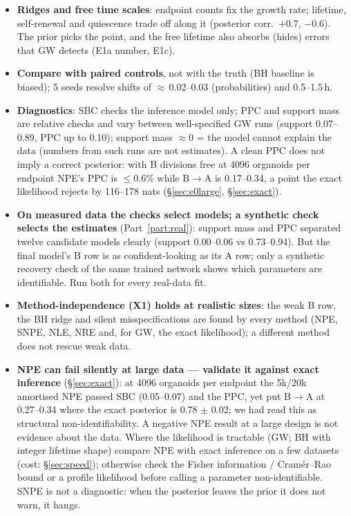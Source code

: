 \documentclass[10pt,a4paper]{article}
\begin{document}
\begin{itemize}
\item \textbf{Ridges and free time scales}: endpoint counts fix the growth rate; lifetime, self-renewal and quiescence trade off along it (posterior corr.\ $+0.7$, $-0.6$). The prior picks the point, and the free lifetime also absorbs (hides) errors that GW detects (E1a number, E1c).
\item \textbf{Compare with paired controls}, not with the truth (BH baseline is biased); 5 seeds resolve shifts of $\approx$\,0.02--0.03 (probabilities) and 0.5--1.5\,h.
\item \textbf{Diagnostics}: SBC checks the inference model only; PPC and support mass are relative checks and vary between well-specified GW runs (support 0.07--0.89, PPC up to 0.10); support mass $\approx 0$ = the model cannot explain the data (numbers from such runs are not estimates). A clean PPC does not imply a correct posterior: with B divisions free at 4096 organoids per endpoint NPE's PPC is $\le 0.6\%$ while B$\to$A is 0.17--0.34, a point the exact likelihood rejects by 116--178 nats (\S\ref{sec:e0large}, \S\ref{sec:exact}).
\item \textbf{On measured data the checks select models; a synthetic check selects the estimates} (Part~\ref{part:real}): support mass and PPC separated twelve candidate models clearly (support 0.00--0.06 vs 0.73--0.94). But the final model's B row is as confident-looking as its A row; only a synthetic recovery check of the same trained network shows which parameters are identifiable. Run both for every real-data fit.
\item \textbf{Method-independence (X1) holds at realistic sizes}: the weak B row, the BH ridge and silent misspecifications are found by every method (NPE, SNPE, NLE, NRE and, for GW, the exact likelihood); a different method does not rescue weak data.
\item \textbf{NPE can fail silently at large data --- validate it against exact inference} (\S\ref{sec:exact}): at 4096 organoids per endpoint the 5k/20k amortised NPE passed SBC (0.05--0.07) and the PPC, yet put B$\to$A at 0.27--0.34 where the exact posterior is 0.78 $\pm$ 0.02; we had read this as structural non-identifiability. A negative NPE result at a large design is not evidence about the data. Where the likelihood is tractable (GW; BH with integer lifetime shape) compare NPE with exact inference on a few datasets (cost: \S\ref{sec:speed}); otherwise check the Fisher information / Cram\'er--Rao bound or a profile likelihood before calling a parameter non-identifiable. SNPE is not a diagnostic: when the posterior leaves the prior it does not warn, it hangs.
\end{itemize}
\end{document}
